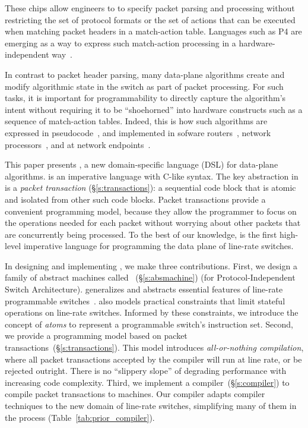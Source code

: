 These chips allow engineers to to specify packet parsing and
processing without restricting the set of protocol formats or the set
of actions that can be executed when matching packet headers in a
match-action table. Languages such as P4 are emerging as a way to
express such match-action processing in a hardware-independent
way~\cite{p4,p4spec,dc_p4}.


In contrast to packet header parsing, many data-plane algorithms
create and modify algorithmic state in the switch as part of packet
processing. For such tasks, it is important for programmability to
directly capture the algorithm's intent without requiring it to be
``shoehorned'' into hardware constructs such as a sequence of
match-action tables. Indeed, this is how such algorithms are expressed
in pseudocode~\cite{red, csfq, codel_code, avq, blue}, and implemented
in sofware routers~\cite{click, dpdk, routebricks}, network
processors~\cite{packetc, nova}, and at network
endpoints~\cite{qdisc}.

This paper presents \pktlanguage, a new domain-specific language (DSL)
for data-plane algorithms.  \pktlanguage is an imperative language
with C-like syntax. The key abstraction in \pktlanguage is a {\em
  packet transaction} (\S\ref{s:transactions}): a sequential code
block that is atomic and isolated from other such code blocks. Packet
transactions provide a convenient programming model, because they
allow the programmer to focus on the operations needed for each packet
without worrying about other packets that are concurrently being
processed. To the best of our knowledge, \pktlanguage is the first
high-level imperative language for programming the data plane of
line-rate switches.


In designing and implementing \pktlanguage, we make three contributions.
First, we design a family of abstract machines called
\absmachine~(\S\ref{s:absmachine}) (for Protocol-Independent Switch
Architecture). \absmachine generalizes and abstracts essential features of
line-rate programmable switches~\cite{rmt, xpliant, flexpipe}. \absmachine also
models practical constraints that limit stateful operations on line-rate
switches.  Informed by these constraints, we introduce the concept of {\em
atoms} to represent a programmable switch's instruction set.  Second, we
provide a programming model based on packet
transactions~(\S\ref{s:transactions}).  This model introduces
\textit{all-or-nothing compilation}, where all packet transactions accepted by
the compiler will run at line rate, or be rejected outright. There is no
``slippery slope'' of degrading performance with increasing code complexity.
Third, we implement a compiler~(\S\ref{s:compiler}) to compile packet
transactions to \absmachine machines. Our compiler adapts compiler techniques
to the new domain of line-rate switches, simplifying many of them in the
process (Table~\ref{tab:prior_compiler}).

